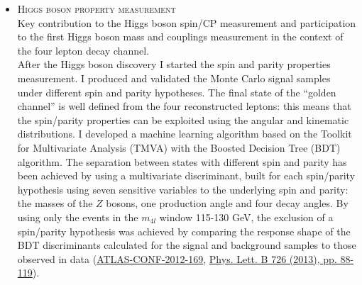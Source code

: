 \begin{cvinterests}
{\begin{itemize}[labelwidth=0.05in,align=right,leftmargin=!,labelsep=0pt,
itemsep=0.0em]
optimisation, fine tuned in the 120--130 \si{\giga\electronvolt} mass region.
The optimisation has been done in order to increase the signal-background
discrimination power and to reach a higher sensitivity to Higgs boson signal
events. The kinematic variables considered were the opposite-charge dilepton
invariant mass closer to the PDG $Z$ mass, the other opposite-charge dilepton
invariant mass and the leptons transverse momenta. I contributed to the
background estimation of the irreducible background, verifying the SM
prediction of continuum $ZZ$ process through dedicated studies and using
different MC generators. I also contributed to the reducible background
estimation ($Z$+jets and $t\bar{t}$), performed in control regions where the
$b\bar{b}$ or $t\bar{t}$ contributions are enhanced
(\href{https://atlas.web.cern.ch/Atlas/GROUPS/PHYSICS/CONFNOTES/ATLAS-CONF-2012-092/}{ATLAS-CONF-2012-092},
\href{http://www.sciencedirect.com/science/article/pii/S037026931200857X}{Phys. Lett. B 716 (2012) 1-29}).
%
\item[] \textsc{Higgs boson property measurement}\\
Key contribution to the Higgs boson spin/CP measurement and participation
to the first Higgs boson mass and couplings measurement in the context of the
four lepton decay channel.\\
After the Higgs boson discovery I started the spin and parity properties
measurement. I produced and validated the Monte Carlo signal samples under
different spin and parity hypotheses. The final state of the ``golden channel''
is well defined from the four reconstructed leptons: this means that the
spin/parity properties can be exploited using the angular and kinematic
distributions. I developed a machine learning algorithm based on the Toolkit
for Multivariate Analysis (TMVA) with the Boosted Decision Tree (BDT) algorithm.
The separation between states with different spin
and parity has been achieved by using a multivariate discriminant, built for
each spin/parity hypothesis using seven sensitive variables to the underlying
spin and parity: the masses of the $Z$ bosons, one production angle and four
decay angles. By using only the events in the $m_{4l}$ window 115-130
\si{\giga\electronvolt}, the exclusion of a spin/parity hypothesis was
achieved by comparing the response shape of the BDT discriminants calculated
for the signal and background samples to those observed in data
(\href{https://atlas.web.cern.ch/Atlas/GROUPS/PHYSICS/CONFNOTES/ATLAS-CONF-2012-169/}{ATLAS-CONF-2012-169}, 
\href{http://www.sciencedirect.com/science/article/pii/S0370269313006369}{Phys. Lett. B 726 (2013), pp. 88-119}).\\

\end{itemize}}
\end{cvinterests}
